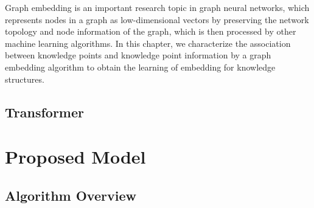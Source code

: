 Graph embedding is an important research topic in graph neural networks, which represents nodes in a graph as low-dimensional vectors by preserving the network topology and node information of the graph, which is then processed by other machine learning algorithms. In this chapter, we characterize the association between knowledge points and knowledge point information by a graph embedding algorithm to obtain the learning of embedding for knowledge structures. 

\subsection{Transformer}


\section{Proposed Model}

\subsection{Algorithm Overview}


